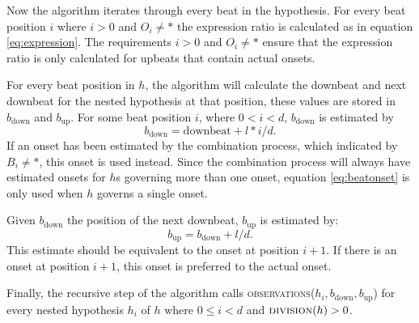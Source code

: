 Now the algorithm iterates through every beat in the hypothesis. For every beat position $i$ where $i > 0$ and $O_i \neq *$ the expression ratio is calculated as in equation \ref{eq:expression}. The requirements $i > 0$ and $O_i \neq *$ ensure that the expression ratio is only calculated for upbeats that contain actual onsets. 

For every beat position in $h$, the algorithm will calculate the downbeat and next downbeat for the nested hypothesis at that position, these values are stored in $b_{\mathrm{down}}$ and $b_{\mathrm{up}}$. 
For some beat position $i$, where $0 < i < d$, $b_{\mathrm{down}}$ is estimated by
\begin{equation}
\label{eq:beatonset}
b_{\mathrm{down}} = \mathrm{downbeat} + l * i/d.
\end{equation}
If an onset has been estimated by the combination process, which indicated by $B_i \neq *$, this onset is used instead. Since the combination process will always have estimated onsets for $h$s governing more than one onset, equation \ref{eq:beatonset} is only used when $h$ governs a single onset.

Given $b_{\mathrm{down}}$ the position of the next downbeat, $b_{\mathrm{up}}$ is estimated by:
\begin{equation}
b_{\mathrm{up}} = b_{\mathrm{down}} + l/d.
\end{equation}
This estimate should be equivalent to the onset at position $i+1$. If there is an onset at position $i+1$, this onset is preferred to the actual onset.

Finally, the recursive step of the algorithm calls \textsc{observations}($h_i, b_{\mathrm{down}}, b_{\mathrm{up}}$) for every nested hypothesis $h_i$ of $h$ where $0 \leq i < d$ and $\textsc{division}(h) > 0$.


